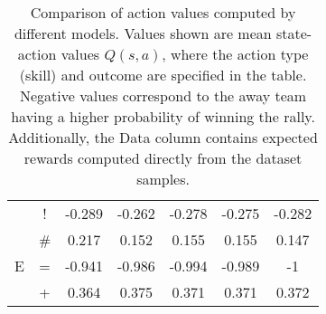 \documentclass{sfuthesis}
\begin{document}
\begin{table}[]
\begin{tabular}{ccccccc}
		& \multicolumn{1}{c|}{!}                & -0.289             & -0.262                & -0.278               & \multicolumn{1}{c|}{-0.275}              & -0.282        \\
		& \multicolumn{1}{c|}{\#}               & 0.217              & 0.152                 & 0.155                & \multicolumn{1}{c|}{0.155}               & 0.147         \\ \hline
		E              & \multicolumn{1}{c|}{=}                & -0.941             & -0.986                & -0.994               & \multicolumn{1}{c|}{-0.989}              & -1            \\
		& \multicolumn{1}{c|}{+}                & 0.364              & 0.375                 & 0.371                & \multicolumn{1}{c|}{0.371}               & 0.372        
	\end{tabular}
	\caption{Comparison of action values computed by different models. Values shown are mean state-action values $Q(s,a)$, where the action type (skill) and outcome are specified in the table. Negative values correspond to the away team having a higher probability of winning the rally. Additionally, the Data column contains expected rewards computed directly from the dataset samples.}
	\label{tab:qvalues_home}
\end{table}
\end{document}
